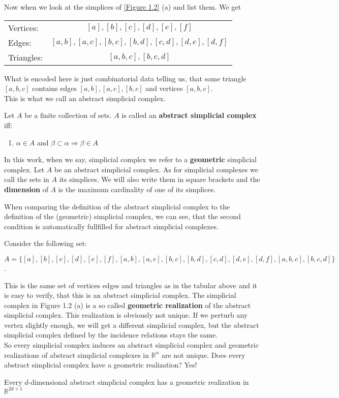 Now when we look at the simplices of \ref{Figure 1.2} (a) and list them. We get
\begin{center}
    \begin{tabular}{lc}
        Vertices: & $[a], [b], [c], [d], [e], [f]$ \\
        Edges: & $[a,b],[a,c],[b,c],[b,d],[c,d],[d,e],[d,f]$ \\
        Triangles: & $[a,b,c], [b,c,d]$
    \end{tabular}
\end{center}

What is encoded here is just combinatorial data telling us, that some triangle $[a,b,c]$ contains edges $[a,b],[a,c],[b,c]$ and vertices $[a,b,c]$.\\
This is what we call an abstract simplicial complex.
\begin{defi}
    Let $A$ be a finite collection of sets. $A$ is called an \textbf{abstract simplicial complex} iff:
    \begin{enumerate}
        \item $\alpha \in A$ and $\beta \subset \alpha \Rightarrow \beta \in A$
    \end{enumerate}
\end{defi}

\begin{rem}
    In this work, when we say, simplicial complex we refer to a \textbf{geometric} simplicial complex.
    Let $A$ be an abstract simplicial complex. As for simplicial complexes we call the sets in $A$ its simplices. We will also write them in square brackets and the
    \textbf{dimension} of $A$ is the maximum cardinality of one of its simplices.
\end{rem}

\begin{obs}
    When comparing the definition of the abstract simplicial complex to the definition of the (geometric) simplicial complex, we can see, that the second
    condition is automatically fullfilled for abstract simplicial complexes.
\end{obs}

Consider the following set: \\
\begin{center}
    $A = \{[a],[b],[c],[d],[e],[f],[a,b],[a,c],[b,c],[b,d],[c,d],[d,e],[d,f],[a,b,c],[b,c,d]\}$.
\end{center}
This is the same set of vertices edges and triangles as in the tabular above and it is easy to verify, that this is an abstract simplicial complex.
The simplicial complex in Figure 1.2 (a) is a so called \textbf{geometric realization} of the abstract simplicial complex.
This realization is obviously not unique. If we perturb any vertex slightly enough, we will get a different simplicial complex,
but the abstract simplicial complex defined by the incidence relations stays the same. \\
So every simplicial complex induces an abstract simplicial complex and geometric realizations of abstract simplicial complexes in $\mathbb{R}^n$ are not unique.
Does every abstract simplicial complex have a geometric realization? Yes! \cite[p. 64]{Computational+Topology}

\begin{thm}
    Every $d$-dimensional abstract simplicial complex has a geometric realization in $\mathbb{R}^{2d+1}$
\end{thm}


